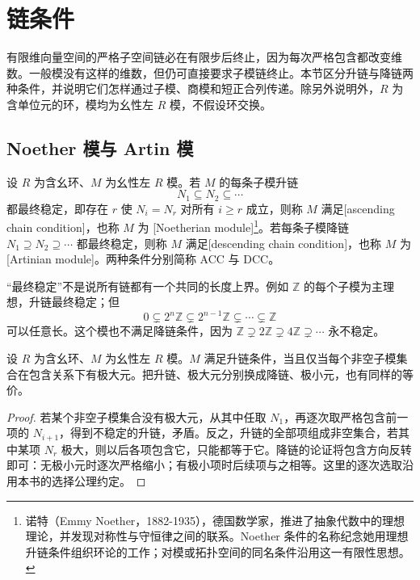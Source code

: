
\section{链条件}
\label{b2:sec:1201}

有限维向量空间的严格子空间链必在有限步后终止，因为每次严格包含都改变维数。一般模没有这样的维数，但仍可直接要求子模链终止。本节区分升链与降链两种条件，并说明它们怎样通过子模、商模和短正合列传递。除另外说明外，\(R\) 为含单位元的环，模均为幺性左 \(R\) 模，不假设环交换。

%
%

\subsection{Noether 模与 Artin 模}
\label{b2:subsec:1201:01}

\begin{definition}\label{b2:def:noetherian-artinian-module}
	设 \(R\) 为含幺环、\(M\) 为幺性左 \(R\) 模。若 \(M\) 的每条子模升链
	\[
		N_1\subseteq N_2\subseteq\cdots
	\]
	都最终稳定，即存在 \(r\) 使 \(N_i=N_r\) 对所有 \(i\ge r\) 成立，则称 \(M\) 满足[ascending chain condition]，也称 \(M\) 为 [Noetherian module]\footnote{诺特（Emmy Noether，1882-1935），德国数学家，推进了抽象代数中的理想理论，并发现对称性与守恒律之间的联系。Noether 条件的名称纪念她用理想升链条件组织环论的工作；对模或拓扑空间的同名条件沿用这一有限性思想。}。若每条子模降链 \(N_1\supseteq N_2\supseteq\cdots\) 都最终稳定，则称 \(M\) 满足[descending chain condition]，也称 \(M\) 为 [Artinian module]。两种条件分别简称 ACC 与 DCC。
\end{definition}

“最终稳定”不是说所有链都有一个共同的长度上界。例如 \(\mathbb Z\) 的每个子模为主理想，升链最终稳定；但
\[
	0\subsetneq 2^n\mathbb Z\subsetneq2^{n-1}\mathbb Z \subsetneq\cdots\subsetneq\mathbb Z
\]
可以任意长。这个模也不满足降链条件，因为 \(\mathbb Z\supsetneq2\mathbb Z\supsetneq4\mathbb Z\supsetneq\cdots\) 永不稳定。

\begin{proposition}\label{b2:prop:chain-maximal-minimal}
	设 \(R\) 为含幺环、\(M\) 为幺性左 \(R\) 模。\(M\) 满足升链条件，当且仅当每个非空子模集合在包含关系下有极大元。把升链、极大元分别换成降链、极小元，也有同样的等价。
\end{proposition}
\begin{proof}
	若某个非空子模集合没有极大元，从其中任取 \(N_1\)，再逐次取严格包含前一项的 \(N_{i+1}\)，得到不稳定的升链，矛盾。反之，升链的全部项组成非空集合，若其中某项 \(N_r\) 极大，则以后各项包含它，只能都等于它。降链的论证将包含方向反转即可：无极小元时逐次严格缩小；有极小项时后续项与之相等。这里的逐次选取沿用本书的选择公理约定。
\end{proof}

